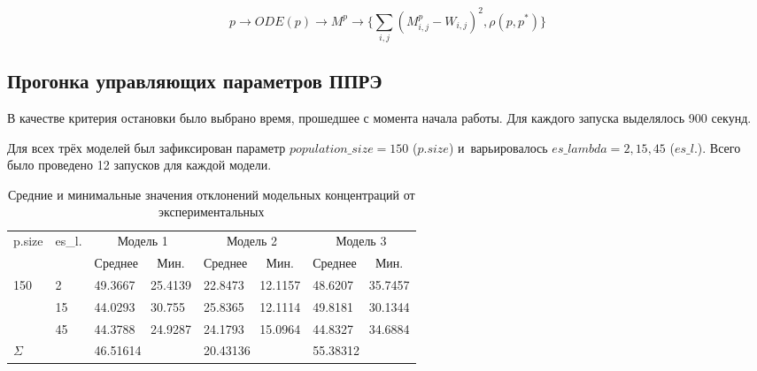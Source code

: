 \[ 
p \rightarrow ODE(p) \rightarrow M^p 
\rightarrow \{ \sum\limits_{i,j}(M_{i,j}^p - W_{i,j})^2 , \rho(p,p^*) \}
\]

\subsection{Прогонка управляющих параметров ППРЭ} \label{s3_2}

В качестве критерия остановки было выбрано время, прошедшее с момента начала 
работы. Для каждого запуска выделялось 900 секунд. 

Для всех трёх моделей был зафиксирован параметр $population\_size = 150$ 
($p.size$) и~варьировалось $es\_lambda = 2,15,45$ ($es\_l.$). Всего было 
проведено 12 запусков для каждой модели. 

\begin{table}[h]
\centering
\def\arraystretch{1.5} %
\begin{tabular}{|l|l|llllll|}
\hline %
  \multirow{2}{*}{p.size} & 
  \multirow{2}{*}{es\_l.} & 
  \multicolumn{2}{c|}{Модель 1} & 
  \multicolumn{2}{c|}{Модель 2} & 
  \multicolumn{2}{c|}{Модель 3} \\ \cline{3-8} 
  & & 
  \multicolumn{1}{c|}{Среднее} & 
  \multicolumn{1}{c|}{Мин.} & 
  \multicolumn{1}{c|}{Среднее} & 
  \multicolumn{1}{c|}{Мин.} & 
  \multicolumn{1}{c|}{Среднее} & 
  \multicolumn{1}{c|}{Мин.} \\ 

\hline %
\multirow{3}{*}{150} 
 & 2  & 49.3667 & 25.4139 & 22.8473 & 12.1157 & 48.6207 & 35.7457 \\ \cline{2-2}
 & 15 & 44.0293 & 30.755  & 25.8365 & 12.1114 & 49.8181 & 30.1344 \\ \cline{2-2}
 & 45 & 44.3788 & 24.9287 & 24.1793 & 15.0964 & 44.8327 & 34.6884 \\ 

\hline %
\multicolumn{2}{|l|}{$\Sigma$} & 
\multicolumn{2}{l|}{46.51614} & 
\multicolumn{2}{l|}{20.43136} & 
\multicolumn{2}{l|}{55.38312} \\ 

\hline %
\end{tabular}
\caption{Средние и минимальные значения отклонений модельных концентраций от 
экспериментальных}
\label{contable1}
\end{table}


